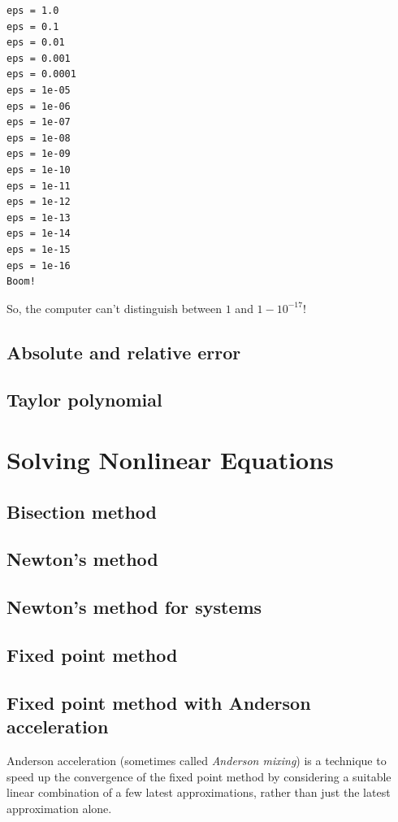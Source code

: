 \documentclass[article,A4,12pt]{llncs}
\begin{document}
{\small
\begin{verbatim}
eps = 1.0
eps = 0.1
eps = 0.01
eps = 0.001
eps = 0.0001
eps = 1e-05
eps = 1e-06
eps = 1e-07
eps = 1e-08
eps = 1e-09
eps = 1e-10
eps = 1e-11
eps = 1e-12
eps = 1e-13
eps = 1e-14
eps = 1e-15
eps = 1e-16
Boom!
\end{verbatim}
}
\noindent
So, the computer can't distinguish between $1$ and $1 - 10^{-17}$!

\subsection{Absolute and relative error}




\subsection{Taylor polynomial}



\section{Solving Nonlinear Equations}




\subsection{Bisection method}



\subsection{Newton's method}

\subsection{Newton's method for systems}



\subsection{Fixed point method}


\subsection{Fixed point method with Anderson acceleration}

Anderson acceleration (sometimes called {\em Anderson mixing}) is a technique
to speed up the convergence of the fixed point method by considering 
a suitable linear combination of a few latest approximations, rather than 
just the latest approximation alone. 
\end{document}
